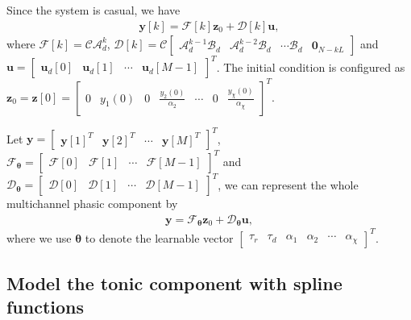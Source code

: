 \documentclass[]{article}
\begin{document}
Since the system is casual, we have
\begin{align} \label{fml:the:out-dis}
  \mathbf{y}[k] = \mathcal{F}[k] \mathbf{z}_0 + \mathcal{D}[k] \mathbf{u},
\end{align}
where $\mathcal{F}[k] = \mathcal{C}\mathcal{A}_d^k$, $\mathcal{D}[k] = \mathcal{C} \begin{bmatrix}
  \mathcal{A}_d^{k-1} \mathcal{B}_d & \mathcal{A}_d^{k-2} \mathcal{B}_d & \cdots \mathcal{B}_d & \mathbf{0}_{N-kL}
\end{bmatrix}$ and \\$\mathbf{u} = \begin{bmatrix}
  \mathbf{u}_d[0] & \mathbf{u}_d[1] & \cdots & \mathbf{u}_d[M-1]
\end{bmatrix}^T$. The initial condition is configured as \\$\mathbf{z}_{0} = \mathbf{z}[0] = \begin{bmatrix}
  0 & y_1(0) & 0 & \frac{y_2(0)}{\alpha_2} & \cdots & 0 & \frac{y_{\chi}(0)}{\alpha_{\chi}}
\end{bmatrix}^T$.

Let $\mathbf{y} = \begin{bmatrix}
\mathbf{y}[1]^T & \mathbf{y}[2]^T & \cdots & \mathbf{y}[M]^T
\end{bmatrix}^T$, $\mathcal{F}_{\boldsymbol{\theta}} = \begin{bmatrix}
\mathcal{F}[0] & \mathcal{F}[1] & \cdots & \mathcal{F}[M-1]
\end{bmatrix}^T$ and \\$\mathcal{D}_{\boldsymbol{\theta}} = \begin{bmatrix}
\mathcal{D}[0] & \mathcal{D}[1] & \cdots & \mathcal{D}[M-1]
\end{bmatrix}^T$, we can represent the whole multichannel phasic component by
\begin{align} \label{fml:the:out-dis-all}
  \mathbf{y} = \mathcal{F}_{\boldsymbol{\theta}} \mathbf{z}_{0} + \mathcal{D}_{\boldsymbol{\theta}} \mathbf{u},
\end{align}
where we use $\boldsymbol{\theta}$ to denote the learnable vector $\begin{bmatrix}
  \tau_r & \tau_d & \alpha_1 & \alpha_2 & \cdots & \alpha_{\chi}
\end{bmatrix}^T$.

\subsection{Model the tonic component with spline functions}
\end{document}
